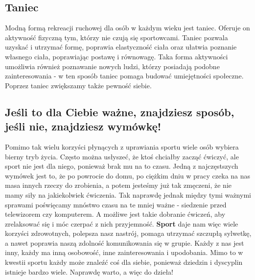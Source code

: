 \documentclass[12pt, letterpaper, titlepage]{article}
\begin{document}
\subsection*{Taniec}
Modną formą rekreacji ruchowej dla osób w każdym wieku jest taniec. Oferuje on aktywność fizyczną tym, którzy nie czują się sportowcami. Taniec pozwala uzyskać i utrzymać formę, poprawia elastyczność ciała oraz ułatwia poznanie własnego ciała, poprawiając postawę i równowagę. Taka forma aktywności umożliwia również poznawanie nowych ludzi, którzy posiadają podobne zainteresowania - w ten sposób taniec pomaga budować umiejętności społeczne. Poprzez taniec zwiększamy także pewność siebie.
\newpage 
\begin{center}
\section*{Jeśli to dla Ciebie ważne, znajdziesz sposób, jeśli nie, znajdziesz wymówkę!}
\end{center}
Pomimo tak wielu korzyści płynących z uprawiania sportu wiele osób wybiera bierny tryb życia. Często można usłyszeć, że ktoś chciałby zacząć ćwiczyć, ale sport nie jest dla niego, ponieważ brak mu na to czasu. Jedną z najczęstszych wymówek jest to, że po powrocie do domu, po ciężkim dniu w pracy czeka na nas masa innych rzeczy do zrobienia, a potem jesteśmy już tak zmęczeni, że nie mamy siły na jakiekolwiek ćwiczenia. Tak naprawdę jednak między tymi ważnymi sprawami poświęcamy mnóstwo czasu na te mniej ważne - siedzenie przed telewizorem czy komputerem. A możliwe jest takie dobranie ćwiczeń, aby zrelaksować się i móc czerpać z nich przyjemność.
\newline
\newline
\textbf{Sport} daje nam więc wiele korzyści zdrowotnych, polepsza nasz nastrój, pomaga utrzymać szczupłą sylwetkę, a nawet poprawia naszą zdolność komunikowania się w grupie.  Każdy z nas jest inny, każdy ma inną osobowość, inne zainteresowania i upodobania. Mimo to w kwestii sportu każdy może znaleźć coś dla siebie, ponieważ dziedzin i dyscyplin istnieje bardzo wiele. Naprawdę warto, a więc do dzieła!
\end{document}
